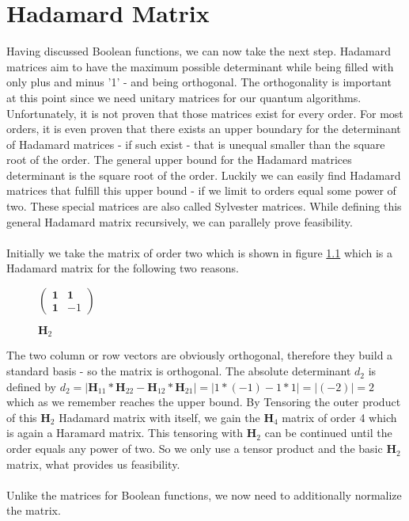 \documentclass[oneside]{thesisclass}
\begin{document}
\chapter{Hadamard Matrix}
Having discussed Boolean functions, we can now take the next step.
Hadamard matrices aim to have the maximum possible determinant while being filled with only plus and minus '1' - and being orthogonal.
The orthogonality is important at this point since we need unitary matrices for our quantum algorithms.
Unfortunately, it is not proven that those matrices exist for every order.
For most orders, it is even proven that there exists an upper boundary for the determinant of Hadamard matrices - if such exist - that is unequal smaller than the square root of the order.
The general upper bound for the Hadamard matrices determinant is the square root of the order.
Luckily we can easily find Hadamard matrices that fulfill this upper bound - if we limit to orders equal some power of two.
These special matrices are also called Sylvester matrices.
While defining this general Hadamard matrix recursively, we can parallely prove feasibility.\\
\\Initially we take the matrix of order two which is shown in figure \ref{h2}
which is a Hadamard matrix for the following two reasons.
\begin{figure}
 \begin{center}
  $
 \begin{pmatrix}
  \mathbf 1 & \mathbf 1 \\
  \mathbf 1 & \mathbf -1
  \end{pmatrix}
 $
  \caption{$\mathbf H_2$}
  \label{h2}
 \end{center}
\end{figure}
The two column or row vectors are obviously orthogonal, therefore they build a standard basis - so the matrix is orthogonal.
The absolute determinant $d_2$ is defined by $d_2 = |\mathbf H_{11} * \mathbf H_{22} - \mathbf H_{12} * \mathbf H_{21}| = |1 * (-1) - 1 * 1| = |(-2)| = 2$ which as we remember reaches the upper bound.
By Tensoring the outer product of this $\mathbf H_2$ Hadamard matrix with itself, we gain the $\mathbf H_4$ matrix of order 4 which is again a Haramard matrix.
This tensoring with $\mathbf H_2$ can be continued until the order equals any power of two.
So we only use a tensor product and the basic $\mathbf H_2$ matrix, what provides us feasibility.\\
\\Unlike the matrices for Boolean functions, we now need to additionally normalize the matrix.
\end{document}
